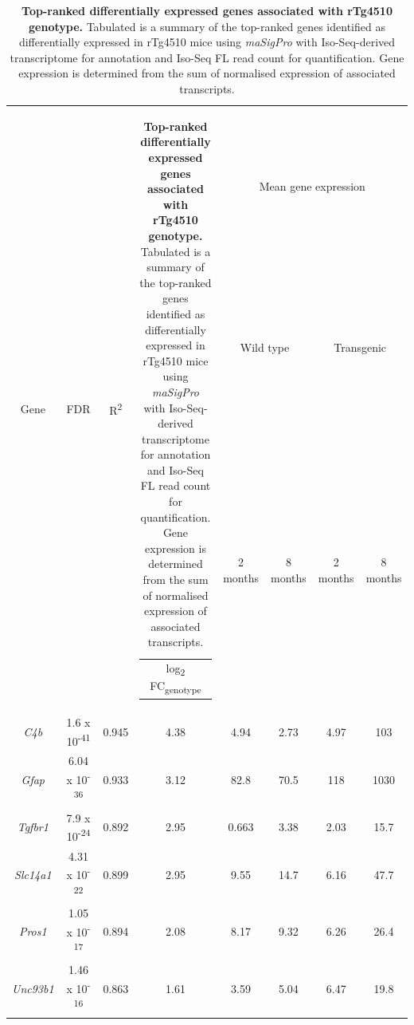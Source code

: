 \vspace{2cm}
\begin{table}[!htp]
	\centering
	\captionsetup{width=0.95\textwidth}
	\setlength\tabcolsep{3.5pt} %
	\caption[Top-ranked differentially expressed genes associated with rTg4510 genotype]%
	{\textbf{Top-ranked differentially expressed genes associated with rTg4510 genotype.} Tabulated is a summary of the top-ranked genes identified as differentially expressed in rTg4510 mice using \textit{maSigPro} with Iso-Seq-derived transcriptome for annotation and Iso-Seq FL read count for quantification. Gene expression is determined from the sum of normalised expression of associated transcripts.}
	\begin{threeparttable}
	\begin{tabularx}{0.95\textwidth}{cccccccc}
	\toprule
	\multirow{3}{*}{Gene} &
	\multirow{3}{*}{FDR\tnote{a}} &
	\multirow{3}{*}{R\textsuperscript{2}\tnote{,b}} &
	\multirow{3}{*}{\begin{tabular}[c]{@{}c@{}}log\textsubscript{2} FC\textsubscript{genotype}\tnote{c}\end{tabular}} &
	\multicolumn{4}{c}{Mean gene expression} \\ \cmidrule(l){5-8} 
	&          &       &      & \multicolumn{2}{c}{Wild type} & \multicolumn{2}{c}{Transgenic} \\ \cmidrule(l){5-8} 
	&          &       &      & 2 months      & 8 months      & 2 months       & 8 months      \\ \midrule
	\textit{C4b}    & 1.6 x 10\textsuperscript{-41}  & 0.945 & 4.38 & 4.94          & 2.73          & 4.97           & 103           \\
	\textit{Gfap}     & 6.04 x 10\textsuperscript{-36} & 0.933 & 3.12  & 82.8          & 70.5          & 118            & 1030           \\
	\textit{Tgfbr1}  & 7.9 x 10\textsuperscript{-24}  & 0.892 & 2.95 & 0.663         & 3.38          & 2.03           & 15.7          \\
	\textit{Slc14a1} & 4.31 x 10\textsuperscript{-22} & 0.899 & 2.95 & 9.55          & 14.7          & 6.16           & 47.7            \\
	\textit{Pros1} & 1.05 x 10\textsuperscript{-17} & 0.894 & 2.08 & 8.17          & 9.32         & 6.26           & 26.4          \\
	\textit{Unc93b1} & 1.46 x 10\textsuperscript{-16} & 0.863 & 1.61  & 3.59          & 5.04          & 6.47          & 19.8          \\ \bottomrule

\end{tabularx}
\end{threeparttable}
\end{table}
